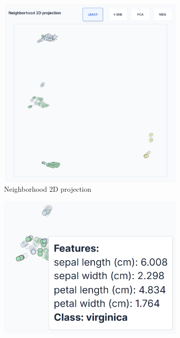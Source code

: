 \begin{figure}
    \centering
    \begin{subfigure}[c]{0.65\textwidth}
        \includegraphics[width=\textwidth]{images/teaching_scatter_initial.png}
        \caption{Neighborhood 2D projection}
        \label{fig:teaching_scatter_initial}
    \end{subfigure}
    \hfill
    \begin{subfigure}[c]{0.33\textwidth}
        \includegraphics[width=\textwidth]{images/teaching_scatter_initial_virginica_instance.png}

\end{subfigure}
\end{figure}
